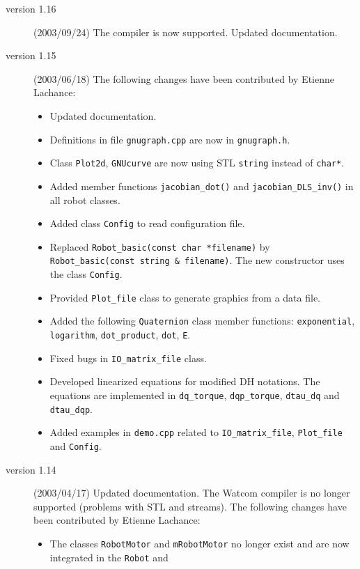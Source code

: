 \documentclass[11pt,fleqn,letterpaper]{report}
\begin{document}
\begin{description}
\item[version 1.16] (2003/09/24) The
   compiler is now supported.
  Updated documentation.
\item[version 1.15] (2003/06/18) 
  The following changes have been contributed by Etienne Lachance:
  \begin{itemize}
  \item Updated documentation.
  \item Definitions in file \texttt{gnugraph.cpp} are now in
    \texttt{gnugraph.h}.
  \item Class \texttt{Plot2d}, \texttt{GNUcurve} are now using
    \textsf{STL} \texttt{string} instead of \texttt{char*}.
  \item Added member functions \texttt{jacobian\_dot()} and
    \texttt{jacobian\_DLS\_inv()} in all robot classes.
  \item Added class \texttt{Config} to read configuration file.
  \item Replaced \texttt{Robot\_basic(const char *filename)} by
    \texttt{Robot\_basic(const string \& filename)}. The new
    constructor uses the class \texttt{Config}.
  \item Provided \texttt{Plot\_file} class to generate graphics from a
    data file.
  \item Added the following \texttt{Quaternion} class member
    functions: \texttt{exponential}, \texttt{logarithm},
    \texttt{dot\_product}, \texttt{dot}, \texttt{E}.
  \item Fixed bugs in \texttt{IO\_matrix\_file} class.
  \item Developed linearized equations for modified DH notations. The
    equations are implemented in \texttt{dq\_torque},
    \texttt{dqp\_torque}, \texttt{dtau\_dq} and \texttt{dtau\_dqp}.
  \item Added examples in \texttt{demo.cpp} related to
    \texttt{IO\_matrix\_file}, \texttt{Plot\_file} and
    \texttt{Config}.
  \end{itemize}
\item[version 1.14] (2003/04/17) Updated documentation. The
  \textsf{Watcom} compiler is no longer supported (problems with
  \textsf{STL} and streams). The following changes have been
  contributed by Etienne Lachance:
  \begin{itemize}
  \item The classes \texttt{RobotMotor} and \texttt{mRobotMotor} no
    longer exist and are now integrated in the \texttt{Robot} and

\end{itemize}
\end{description}
\end{document}
